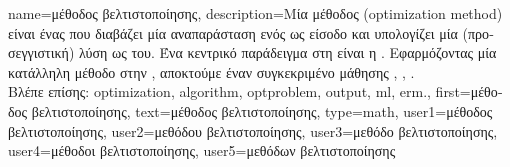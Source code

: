 {name={\foreignlanguage{greek}{μέθοδος βελτιστοποίησης}},
	description={\foreignlanguage{greek}{Μία μέθοδος}  (optimization method) 
		\foreignlanguage{greek}{είναι ένας} 
		 \foreignlanguage{greek}{που διαβάζει μία αναπαράσταση ενός}  
		\foreignlanguage{greek}{ως είσοδο και υπολογίζει μία (προσεγγιστική) λύση ως}   
		\foreignlanguage{greek}{του. Ένα κεντρικό παράδειγμα}  \foreignlanguage{greek}{στη} 
		 \foreignlanguage{greek}{είναι η} . \foreignlanguage{greek}{Εφαρμόζοντας μία κατάλληλη
		μέθοδο}  \foreignlanguage{greek}{στην} , \foreignlanguage{greek}{αποκτούμε έναν 
		συγκεκριμένο}  \foreignlanguage{greek}{μάθησης} 
		\cite{BoydConvexBook}, \cite{BertsekasNonLinProgr}, \cite{nesterov04}. 
		\\
		\foreignlanguage{greek}{Βλέπε επίσης:} \gls{optimization}, \gls{algorithm}, \gls{optproblem}, \gls{output}, \gls{ml}, \gls{erm}.},
	first={\foreignlanguage{greek}{μέθοδος βελτιστοποίησης}},
	text={\foreignlanguage{greek}{μέθοδος βελτιστοποίησης}},
	type=math,
	user1={\foreignlanguage{greek}{μέθοδος βελτιστοποίησης}}, %
	user2={\foreignlanguage{greek}{μεθόδου βελτιστοποίησης}}, %
	user3={\foreignlanguage{greek}{μεθόδο βελτιστοποίησης}}, %
	user4={\foreignlanguage{greek}{μέθοδοι βελτιστοποίησης}}, %
	user5={\foreignlanguage{greek}{μεθόδων βελτιστοποίησης}} %
}

